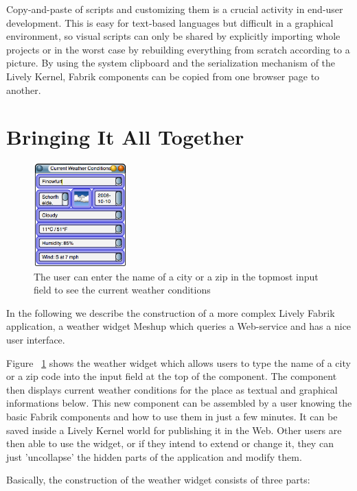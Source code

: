 \documentclass[pdftex, times, 10pt, twocolumn]{article}
\begin{document}
Copy-and-paste of scripts and customizing them is a crucial activity in end-user development.  This is easy for text-based languages but difficult in a graphical environment, so visual scripts can only be shared by explicitly importing whole projects or in the worst case by rebuilding everything from scratch according to a picture.  By using the system clipboard and the serialization mechanism of the Lively Kernel, Fabrik components can be copied from one browser page to another. 



\section{Bringing It All Together}


\begin{figure}[h]\centering
\includegraphics[width=0.320000\textwidth]{weatherExample03.png} 

\caption{The user can enter the name of a city or a zip in the topmost input field to see the current weather conditions }
\label{fig:WeatherExample}
\end{figure}
In the following we describe the construction of a more complex Lively Fabrik application, a weather widget Meshup which queries a Web-service and has a nice user interface. 

Figure ~\ref{fig:WeatherExample} shows the weather widget which allows users to type the name of a city or a zip code into the input field at the top of the component. The component then displays current weather conditions for the place as textual and graphical informations below. This new component can be assembled by a user knowing the basic Fabrik components and how to use them in just a few minutes. It can be saved inside a Lively Kernel world for publishing it in the Web. Other users are then able to use the widget, or if they intend to extend or change it, they can just 'uncollapse' the hidden parts of the application and modify them. 

Basically, the construction of the weather widget consists of three parts: 
\end{document}
